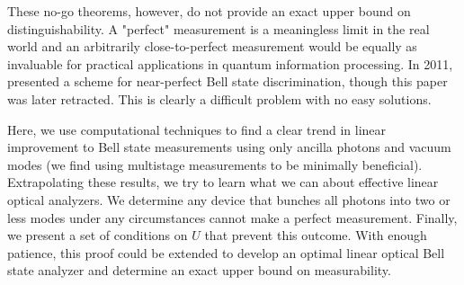 \documentclass[aps,pra,twocolumn,showpacs,superscriptaddress,floatfix,10pt]{revtex4}
\begin{document}
These no-go theorems, however, do not provide an exact upper bound on distinguishability. A "perfect" measurement is a meaningless limit in the real world and an arbitrarily close-to-perfect measurement would be  equally as invaluable for practical applications in quantum information processing. In 2011,~\cite{Pavicic} presented a scheme for near-perfect Bell state discrimination, though this paper was later retracted. This is clearly a difficult problem with no easy solutions.

Here, we use computational techniques to find a clear trend in linear improvement to Bell state measurements using only ancilla photons and vacuum modes (we find using multistage measurements to be minimally beneficial). Extrapolating these results, we try to learn what we can about effective linear optical analyzers. We determine any device that bunches all photons into two or less modes under any circumstances cannot make a perfect measurement. Finally, we present a set of conditions on $U$ that prevent this outcome. With enough patience, this proof could be extended to develop an optimal linear optical Bell state analyzer and determine an exact upper bound on measurability. 
\end{document}
